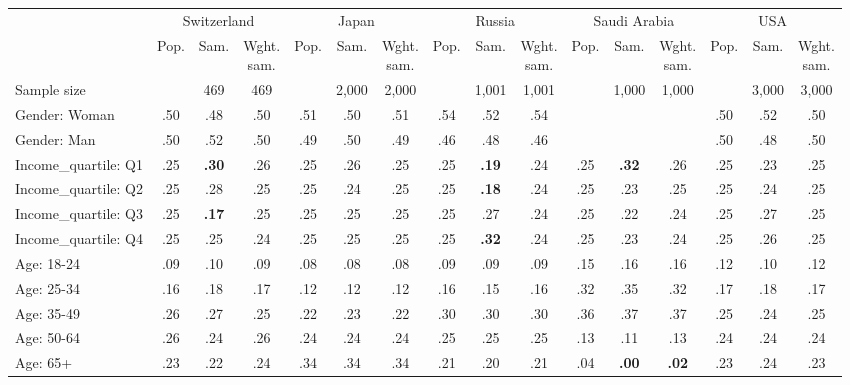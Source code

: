 
\begin{tabular}[t]{lccccccccccccccc}
\toprule
\multicolumn{1}{c}{} & \multicolumn{3}{c}{Switzerland} & \multicolumn{3}{c}{Japan} & \multicolumn{3}{c}{Russia} & \multicolumn{3}{c}{Saudi Arabia} & \multicolumn{3}{c}{USA} \\
\cmidrule(l{3pt}r{3pt}){2-4} \cmidrule(l{3pt}r{3pt}){5-7} \cmidrule(l{3pt}r{3pt}){8-10} \cmidrule(l{3pt}r{3pt}){11-13} \cmidrule(l{3pt}r{3pt}){14-16}
  & Pop. & Sam. & \makecell{Wght.\\sam.} & Pop. & Sam. & \makecell{Wght.\\sam.} & Pop. & Sam. & \makecell{Wght.\\sam.} & Pop. & Sam. & \makecell{Wght.\\sam.} & Pop. & Sam. & \makecell{Wght.\\sam.}\\
\midrule
Sample size &  & 469 & 469 &  & 2,000 & 2,000 &  & 1,001 & 1,001 &  & 1,000 & 1,000 &  & 3,000 & 3,000\\
\addlinespace
Gender: Woman & .50 & .48 & .50 & .51 & .50 & .51 & .54 & .52 & .54 &  &  &  & .50 & .52 & .50\\
Gender: Man & .50 & .52 & .50 & .49 & .50 & .49 & .46 & .48 & .46 &  &  &  & .50 & .48 & .50\\
\addlinespace
Income\_quartile: Q1 & .25 & \textbf{.30} & .26 & .25 & .26 & .25 & .25 & \textbf{.19} & .24 & .25 & \textbf{.32} & .26 & .25 & .23 & .25\\
Income\_quartile: Q2 & .25 & .28 & .25 & .25 & .24 & .25 & .25 & \textbf{.18} & .24 & .25 & .23 & .25 & .25 & .24 & .25\\
Income\_quartile: Q3 & .25 & \textbf{.17} & .25 & .25 & .25 & .25 & .25 & .27 & .24 & .25 & .22 & .24 & .25 & .27 & .25\\
Income\_quartile: Q4 & .25 & .25 & .24 & .25 & .25 & .25 & .25 & \textbf{.32} & .24 & .25 & .23 & .24 & .25 & .26 & .25\\
\addlinespace
Age: 18-24 & .09 & .10 & .09 & .08 & .08 & .08 & .09 & .09 & .09 & .15 & .16 & .16 & .12 & .10 & .12\\
Age: 25-34 & .16 & .18 & .17 & .12 & .12 & .12 & .16 & .15 & .16 & .32 & .35 & .32 & .17 & .18 & .17\\
Age: 35-49 & .26 & .27 & .25 & .22 & .23 & .22 & .30 & .30 & .30 & .36 & .37 & .37 & .25 & .24 & .25\\
Age: 50-64 & .26 & .24 & .26 & .24 & .24 & .24 & .25 & .25 & .25 & .13 & .11 & .13 & .24 & .24 & .24\\
Age: 65+ & .23 & .22 & .24 & .34 & .34 & .34 & .21 & .20 & .21 & .04 & \textbf{.00} & \textbf{.02} & .23 & .24 & .23\\

\end{tabular}
